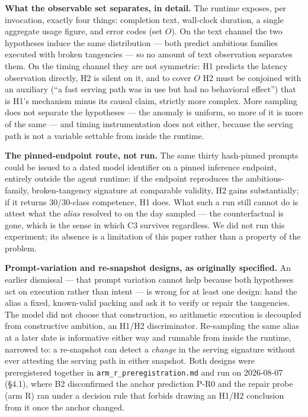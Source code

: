 \textbf{What the observable set separates, in detail.} The runtime exposes, per invocation, exactly four things: completion text, wall-clock duration, a single aggregate usage figure, and error codes (set $O$). On the text channel the two hypotheses induce the same distribution --- both predict ambitious families executed with broken tangencies --- so no amount of text observation separates them. On the timing channel they are not symmetric: H1 predicts the latency observation directly, H2 is silent on it, and to cover $O$ H2 must be conjoined with an auxiliary (``a fast serving path was in use but had no behavioral effect'') that is H1's mechanism minus its causal claim, strictly more complex. More sampling does not separate the hypotheses --- the anomaly is uniform, so more of it is more of the same --- and timing instrumentation does not either, because the serving path is not a variable settable from inside the runtime.

\textbf{The pinned-endpoint route, not run.} The same thirty hash-pinned prompts could be issued to a dated model identifier on a pinned inference endpoint, entirely outside the agent runtime: if the endpoint reproduces the ambitious-family, broken-tangency signature at comparable validity, H2 gains substantially; if it returns 30/30-class competence, H1 does. What such a run still cannot do is attest what the \emph{alias} resolved to on the day sampled --- the counterfactual is gone, which is the sense in which C3 survives regardless. We did not run this experiment; its absence is a limitation of this paper rather than a property of the problem.

\textbf{Prompt-variation and re-snapshot designs, as originally specified.} An earlier dismissal --- that prompt variation cannot help because both hypotheses act on execution rather than intent --- is wrong for at least one design: hand the alias a fixed, known-valid packing and ask it to verify or repair the tangencies. The model did not choose that construction, so arithmetic execution is decoupled from constructive ambition, an H1/H2 discriminator. Re-sampling the same alias at a later date is informative either way and runnable from inside the runtime, narrowed to: a re-snapshot can detect a \emph{change} in the serving signature without ever attesting the serving path in either snapshot. Both designs were preregistered together in \texttt{arm\_r\_preregistration.md} and run on 2026-08-07 (\S4.1), where B2 disconfirmed the anchor prediction P-R0 and the repair probe (arm R) ran under a decision rule that forbids drawing an H1/H2 conclusion from it once the anchor changed.
